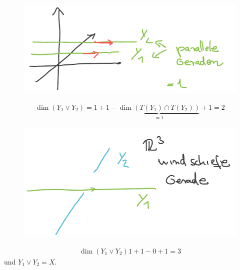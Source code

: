 \begin{beispiel*}[\( X=\reals^3 \)]
    \begin{figure}[H]
        \centering
        \includegraphics[width=0.5\linewidth]{figures/verbindungsraum_parallele_geraden}
        \label{fig:verbindungsraum_parallele_geraden}
    \end{figure}
    \begin{align*}
        \dim (Y_1\vee Y_2)=1+1-\underbrace{\dim(T(Y_1)\cap T(Y_2))}_{=1}+1=2
    \end{align*}
    \begin{figure}[H]
        \centering
        \includegraphics[width=0.6\linewidth]{figures/verbindungsraum_windschiefe_geraden}
        \label{fig:verbindungsraum_windschiefe_geraden}
    \end{figure}
    \begin{align*}
        \dim (Y_1\vee Y_2)1+1-0+1=3
    \end{align*}
    und \( Y_1\vee Y_2=X \).
    
\end{beispiel*}
